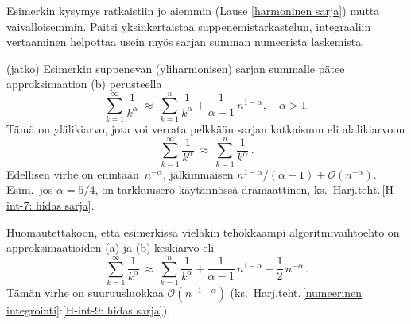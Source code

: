 Esimerkin kysymys ratkaistiin jo aiemmin (Lause \ref{harmoninen sarja}) mutta vaivalloisemmin.
Paitsi yksinkertaistaa suppenemistarkastelun, integraaliin vertaaminen helpottaa usein myös
sarjan summan numeerista laskemista.
\jatko \begin{Exa} (jatko) Esimerkin suppenevan (yliharmonisen) sarjan summalle pätee
approksimaation (b) perusteella
\[
\sum_{k=1}^\infty\frac{1}{k^\alpha}\ 
   \approx\ \sum_{k=1}^n\frac{1}{k^\alpha}+\frac{1}{\alpha-1}\,n^{1-\alpha}, \quad \alpha>1.
\]
Tämä on ylälikiarvo, jota voi verrata pelkkään sarjan katkaisuun eli alalikiarvoon
\[
\sum_{k=1}^\infty\frac{1}{k^\alpha}\ \approx\ \sum_{k=1}^n\frac{1}{k^\alpha}\,.
\]
Edellisen virhe on enintään $\,n^{-\alpha}$, jälkimmäisen 
$n^{1-\alpha}/(\alpha-1)+\mathcal{O}(n^{-\alpha})$. Esim.\ jos $\alpha=5/4$, on tarkkuusero
käytännössä dramaattinen, ks.\ Harj.teht.\,\ref{H-int-7: hidas sarja}. \loppu
\end{Exa}
Huomautettakoon, että esimerkissä vieläkin tehokkaampi algoritmivaihtoehto on
approksimaatioiden (a) ja (b) keskiarvo eli
\[
\sum_{k=1}^\infty \frac{1}{k^\alpha} \,\approx\,
\sum_{k=1}^n\frac{1}{k^\alpha}+\frac{1}{\alpha-1}\,n^{1-\alpha}-\frac{1}{2}\,n^{-\alpha}\,.
\]
Tämän virhe on suuruusluokkaa $\mathcal{O}(n^{-1-\alpha})$
(ks.\ Harj.teht.\,\ref{numeerinen integrointi}:\ref{H-int-9: hidas sarja}).

